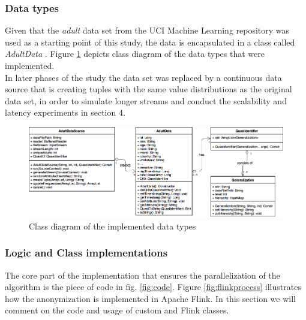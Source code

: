 \subsubsection{Data types}
 Given that the \textit{adult} data set from the UCI Machine Learning repository was used as a starting point of this study, the data is encapsulated in a class called \textit{AdultData} \cite{dua2017}. Figure \ref{fig:classdiagram} depicts class diagram of the data types that were implemented.\\ In later phases of the study the data set was replaced by a continuous data source that is creating tuples with the same value distributions as the original data set, in order to simulate longer streams and conduct the scalability and latency experiments in section 4.
 
 \begin{figure}[H]
    \centering
    \includegraphics[scale=0.5]{Images/ClassDiagram.png}
    \caption{Class diagram of the implemented data types}
    \label{fig:classdiagram}
\end{figure}
 
 
\subsubsection{Logic and Class implementations}
\noindent  The core part of the implementation that ensures the parallelization of the algorithm is the piece of code in fig. \ref{fig:code}. Figure \ref{fig:flinkprocess} illustrates how the anonymization is implemented in Apache Flink. In this section we will comment on the code and usage of custom and Flink classes.  


